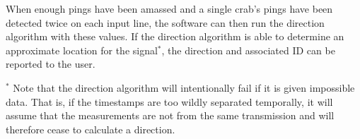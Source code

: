 \documentclass[12pt]{article}
\begin{document}
When enough pings have been amassed and a single crab's pings have been
detected twice on each input line, the software can then run the direction
algorithm with these values.
If the direction algorithm is able to determine an approximate location for
the signal$^*$, the direction and associated ID can be reported to the user.

$^*$ Note that the direction algorithm will intentionally fail if it is given
impossible data.
That is, if the timestamps are too wildly separated temporally, it will assume
that the measurements are not from the same transmission and will therefore
cease to calculate a direction.

\newpage

\printglossary
\end{document}

